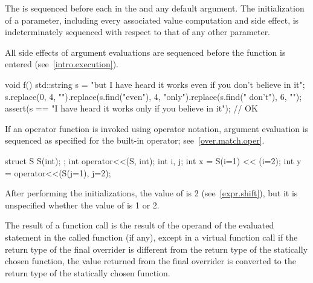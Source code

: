 \pnum
{}%
%
%
The  is sequenced before
each  in the 
and any default argument.
The initialization of a parameter,
including every associated value computation and side effect,
is indeterminately sequenced with respect to that of any other parameter.
\begin{note}
All side effects of
argument evaluations are sequenced before the function is
entered (see~\ref{intro.execution}).
\end{note}
\begin{example}
\begin{codeblock}
void f() {
  std::string s = "but I have heard it works even if you don't believe in it";
  s.replace(0, 4, "").replace(s.find("even"), 4, "only").replace(s.find(" don't"), 6, "");
  assert(s == "I have heard it works only if you believe in it");       // OK
}
\end{codeblock}
\end{example}
\begin{note}
If an operator function is invoked
using operator notation,
argument evaluation is sequenced
as specified for the built-in operator;
see~\ref{over.match.oper}.
\end{note}
\begin{example}
\begin{codeblock}
struct S {
  S(int);
};
int operator<<(S, int);
int i, j;
int x = S(i=1) << (i=2);
int y = operator<<(S(j=1), j=2);
\end{codeblock}
After performing the initializations,
the value of  is 2 (see~\ref{expr.shift}),
but it is unspecified whether the value of  is 1 or 2.
\end{example}

\pnum
The result of a function call is the
result of the operand of the evaluated  statement
in the called function (if any),
except in a virtual function call if the return type of the
final overrider is different from the return type of the statically
chosen function, the value returned from the final overrider is
converted to the return type of the statically chosen function.

